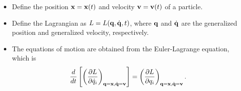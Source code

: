 \documentclass[a4paper,11pt]{report}
\newcommand{\qvecdot}{\dot{\qvec}}
\newcommand{\qdot}{\dot{q}}
\begin{document}
\begin{itemize}
    \item Define the position $\mathbf{x} = \mathbf{x}(t)$ and velocity $\mathbf{v} = \mathbf{v}(t)$ of a particle. 
    
    \item Define the Lagrangian as $L = L(\qvec, \qvecdot,t)$, where $\mathbf{q}$ and $\qvecdot$ are the generalized position and generalized velocity, respectively. 
    
    \item The equations of motion are obtained from the Euler-Lagrange equation, which is 
    \begin{equation}
    \frac{d}{dt} \left [ \left ( \frac{\partial L}{\partial \qdot_i } \right )_{\qvec =  \xvec, \qvecdot = \vvec }  \right] = \left ( \frac{\partial L}{\partial q_i} \right )_{ \qvec =  \xvec, \qvecdot = \vvec} .
    \end{equation}
    

\end{itemize}
\end{document}
